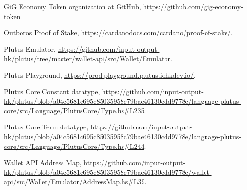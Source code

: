 \documentclass{article}
\begin{document}
\begin{thebibliography}{9}

  GiG Economy Token organization at GitHub, \newline
    \url{https://github.com/gig-economy-token}.

  Outboros Proof of Stake, \newline
    \url{https://cardanodocs.com/cardano/proof-of-stake/}.

  Plutus Emulator, \newline
    \url{https://github.com/input-output-hk/plutus/tree/master/wallet-api/src/Wallet/Emulator}.

  Plutus Playground, \newline
    \url{https://prod.playground.plutus.iohkdev.io/}.

  Plutus Core Constant datatype, \newline
    \url{https://github.com/input-output-hk/plutus/blob/a04c5681c695c85035958c79bae46130cdd9778e/language-plutus-core/src/Language/PlutusCore/Type.hs#L235}.

  Plutus Core Term datatype, \newline
    \url{https://github.com/input-output-hk/plutus/blob/a04c5681c695c85035958c79bae46130cdd9778e/language-plutus-core/src/Language/PlutusCore/Type.hs#L244}.

  Wallet API Address Map, \newline
    \url{https://github.com/input-output-hk/plutus/blob/a04c5681c695c85035958c79bae46130cdd9778e/wallet-api/src/Wallet/Emulator/AddressMap.hs#L39}.

\end{thebibliography}
\end{document}
